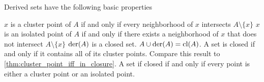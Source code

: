 \begin{proposition}\label{thm:derived_set_properties}
  Derived sets have the following basic properties
  \begin{propenum}
     \( x \) is a cluster point of \( A \) if and only if every neighborhood of \( x \) intersects \( A \setminus \{ x \} \)
     \( x \) is an isolated point of \( A \) if and only if there exists a neighborhood of \( x \) that does not intersect \( A \setminus \{ x \} \)
     \( \operatorname{der}(A) \) is a closed set.
     \( A \cup \operatorname{der}(A) = \operatorname{cl}(A) \).
     A set is closed if and only if it contains all of its cluster points. Compare this result to \cref{thm:cluster_point_iff_in_closure}.
     A set if closed if and only if every point is either a cluster point or an isolated point.
  \end{propenum}
\end{proposition}
